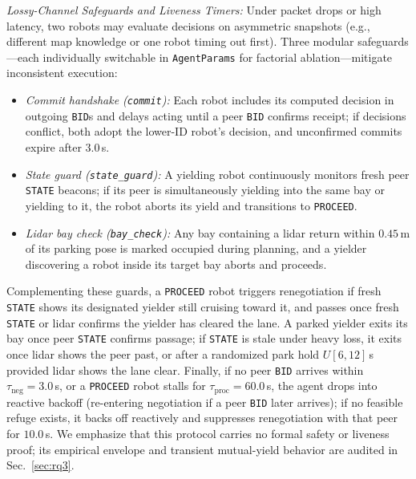 \documentclass[letterpaper,journal]{IEEEtran}
\begin{document}
\smallskip\noindent\emph{Lossy-Channel Safeguards and Liveness Timers:} Under packet drops or high latency, two robots may evaluate decisions on asymmetric snapshots (e.g., different map knowledge or one robot timing out first). Three modular safeguards---each individually switchable in \texttt{AgentParams} for factorial ablation---mitigate inconsistent execution:
\begin{itemize}
\item \emph{Commit handshake (\texttt{commit}):} Each robot includes its computed decision in outgoing \texttt{BID}s and delays acting until a peer \texttt{BID} confirms receipt; if decisions conflict, both adopt the lower-ID robot's decision, and unconfirmed commits expire after $3.0$\,s.
\item \emph{State guard (\texttt{state\_guard}):} A yielding robot continuously monitors fresh peer \texttt{STATE} beacons; if its peer is simultaneously yielding into the same bay or yielding to it, the robot aborts its yield and transitions to \texttt{PROCEED}.
\item \emph{Lidar bay check (\texttt{bay\_check}):} Any bay containing a lidar return within $0.45$\,m of its parking pose is marked occupied during planning, and a yielder discovering a robot inside its target bay aborts and proceeds.
\end{itemize}
Complementing these guards, a \texttt{PROCEED} robot triggers renegotiation if fresh \texttt{STATE} shows its designated yielder still cruising toward it, and passes once fresh \texttt{STATE} or lidar confirms the yielder has cleared the lane. A parked yielder exits its bay once peer \texttt{STATE} confirms passage; if \texttt{STATE} is stale under heavy loss, it exits once lidar shows the peer past, or after a randomized park hold $U[6,12]$\,s provided lidar shows the lane clear. Finally, if no peer \texttt{BID} arrives within $\tau_{\mathrm{neg}}=3.0$\,s, or a \texttt{PROCEED} robot stalls for $\tau_{\mathrm{proc}}=60.0$\,s, the agent drops into reactive backoff (re-entering negotiation if a peer \texttt{BID} later arrives); if no feasible refuge exists, it backs off reactively and suppresses renegotiation with that peer for $10.0$\,s. We emphasize that this protocol carries no formal safety or liveness proof; its empirical envelope and transient mutual-yield behavior are audited in Sec.~\ref{sec:rq3}.
\end{document}
